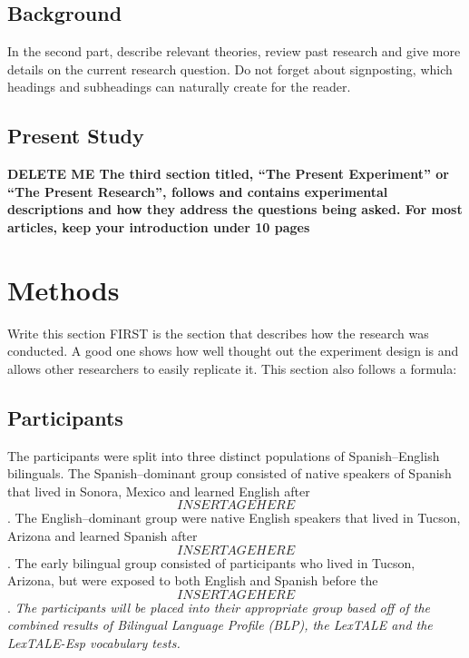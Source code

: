 \subsection{Background}

In the second part, describe relevant theories, review past research and give more details on the current research question. Do not forget about signposting, which headings and subheadings can naturally create for the reader.


\subsection{Present Study}


\textbf{DELETE ME The third section titled, “The Present Experiment” or “The Present Research”, follows and contains experimental descriptions and how they address the questions being asked.
For most articles, keep your introduction under 10 pages}


\section{Methods}

Write this section FIRST
is the section that describes how the research was conducted. A good one shows how well thought out the experiment design is and allows other researchers to easily replicate it. This section also follows a formula:

\subsection{Participants}

The participants were split into three distinct populations of Spanish–English bilinguals. The Spanish–dominant group consisted of native speakers of Spanish that lived in Sonora, Mexico and learned English after \[INSERT AGE HERE\]. The English–dominant group were native English speakers that lived in Tucson, Arizona and learned Spanish after \[INSERT AGE HERE\]. The early bilingual group consisted of participants who lived in Tucson, Arizona, but were exposed to both English and Spanish before the \[INSERT AGE HERE\].
\emph{The participants will be placed into their appropriate group based off of the combined results of Bilingual Language Profile (BLP), the LexTALE and the LexTALE-Esp vocabulary tests.} 

